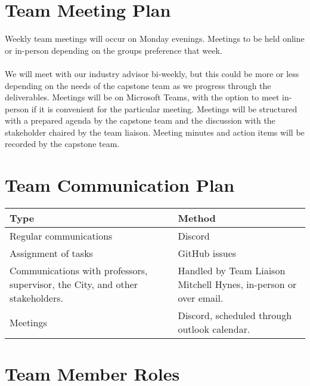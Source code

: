 \documentclass{article}
\begin{document}
\section{Team Meeting Plan}

Weekly team meetings will occur on Monday evenings. Meetings to be
held online or in-person depending on
the groups preference that week.\\
\\
We will meet with our industry advisor bi-weekly, but this could be
more or less depending on the needs of
the capstone team as we progress through the deliverables. Meetings
will be on Microsoft Teams, with the
option to meet in-person if it is convenient for the particular
meeting. Meetings will be structured with a
prepared agenda by the capstone team and the discussion with the
stakeholder chaired by the team liaison.
Meeting minutes and action items will be recorded by the capstone team.

\section{Team Communication Plan}

\begin{longtable}{|m{5cm}|m{8cm}|}
  \hline
  \textbf{Type} & \textbf{Method}\\
  \hline
  Regular communications & Discord\\
  \hline
  Assignment of tasks & GitHub issues\\
  \hline
  Communications with professors, supervisor, the City, and other
  stakeholders. & Handled by Team Liaison Mitchell Hynes,
  in-person or over email.\\
  \hline
  Meetings & Discord, scheduled through outlook calendar.\\
  \hline
\end{longtable}

\section{Team Member Roles}
\end{document}
